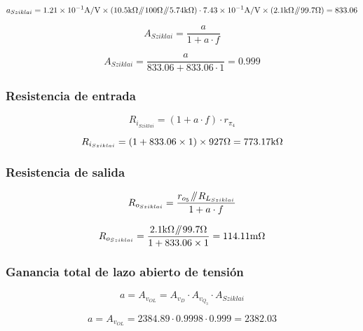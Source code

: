 \begin{equation*}
a_{Sziklai} = \num{1.21E-1} \si[per-mode=symbol]{\ampere\per\volt} \times \left( 10.5 \si[per-mode=symbol]{\kilo\ohm} \parallelresistors 100 \si[per-mode=symbol]{\ohm} \parallelresistors  5.74 \si[per-mode=symbol]{\kilo\ohm} \right) \cdot \num{7.43E-1} \si[per-mode=symbol]{\ampere\per\volt} \times \left( 2.1 \si[per-mode=symbol]{\kilo\ohm} \parallelresistors 99.7 \si[per-mode=symbol]{\ohm} \right) = 833.06
\end{equation*}


\begin{equation}
A_{Sziklai} = \frac{a}{1 + a \cdot f}
\end{equation}

\begin{equation*}
A_{Sziklai} = \frac{a}{833.06 + 833.06 \cdot 1} = 0.999
\end{equation*}

\subsubsection{Resistencia de entrada}

\begin{equation}
R_{i_{Sziklai}} = \left( 1 + a \cdot f \right) \cdot r_{\pi_{4}}
\end{equation}

\begin{equation*}
R_{i_{Sziklai}} = \left( 1 + 833.06 \times 1 \right) \times 927  \si[per-mode=symbol]{\ohm} = 773.17 \si[per-mode=symbol]{\kilo\ohm}
\end{equation*}



\subsubsection{Resistencia de salida}

\begin{equation}
R_{o_{Sziklai}} = \frac{ r_{o_{5}} \parallelresistors R_{L_{Sziklai}}  }{1 + a \cdot f}
\end{equation}

\begin{equation*}
R_{o_{Sziklai}} = \frac{ 2.1 \si[per-mode=symbol]{\kilo\ohm} \parallelresistors 99.7 \si[per-mode=symbol]{\ohm}  }{  1 + 833.06 \times 1 } = 114.11 \si[per-mode=symbol]{\milli\ohm}
\end{equation*}


\subsubsection{Ganancia total de lazo abierto de tensión}

\begin{equation}
a = A_{v_{OL}} = A_{v_{D}} \cdot A_{v_{Q_{3}}} \cdot A_{Sziklai}
\end{equation}

\begin{equation*}
a = A_{v_{OL}} = 2384.89 \cdot 0.9998 \cdot 0.999 = 2382.03
\end{equation*}





